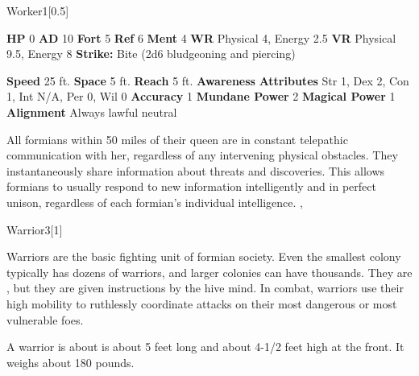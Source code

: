 {{\begin{monsubsection}{Worker}{1}[0.5]
    \begin{spellcontent}
      \begin{spelltargetinginfo}
        \pari \textbf{HP} 0 \monsep
          \textbf{AD} 10 \monsep
          \textbf{Fort} 5 \monsep
          \textbf{Ref} 6 \monsep
          \textbf{Ment} 4
        \pari \textbf{WR} Physical 4, Energy 2.5 \monsep
        \textbf{VR} Physical 9.5, Energy 8
        \pari \textbf{Strike:}
            Bite  (2d6 bludgeoning and piercing)
      \end{spelltargetinginfo}
    \end{spellcontent}
    \begin{monsterfooter}
      \pari \textbf{Speed} 25 ft. \monsep
        \textbf{Space} 5 ft. \monsep
        \textbf{Reach} 5 ft.
      \pari \textbf{Awareness} 
      \pari \textbf{Attributes}
        Str 1, Dex 2,
        Con 1, Int N/A,
        Per 0, Wil 0
      \pari \textbf{Accuracy} 1 \monsep
        \textbf{Mundane Power} 2 \monsep
      \textbf{Magical Power} 1
      \pari \textbf{Alignment} Always lawful neutral
    \end{monsterfooter}
  \end{monsubsection}
        All formians within 50 miles of their queen are in constant telepathic communication with her, regardless of any intervening physical obstacles.
        They instantaneously share information about threats and discoveries.
        This allows formians to usually respond to new information intelligently and in perfect unison, regardless of each formian's individual intelligence.
  ,
  \begin{monsubsection}{Warrior}{3}[1]
    \vspace{-1em}\vspace{-1em}
    \vspace{0em}

    
        Warriors are the basic fighting unit of formian society.
        Even the smallest colony typically has dozens of warriors, and larger colonies can have thousands.
        They are , but they are given instructions by the hive mind.
        In combat, warriors use their high mobility to ruthlessly coordinate attacks on their most dangerous or most vulnerable foes.

        A warrior is about is about 5 feet long and about 4-1/2 feet high at the front.
        It weighs about 180 pounds.
      
    


\end{monsubsection}}}
